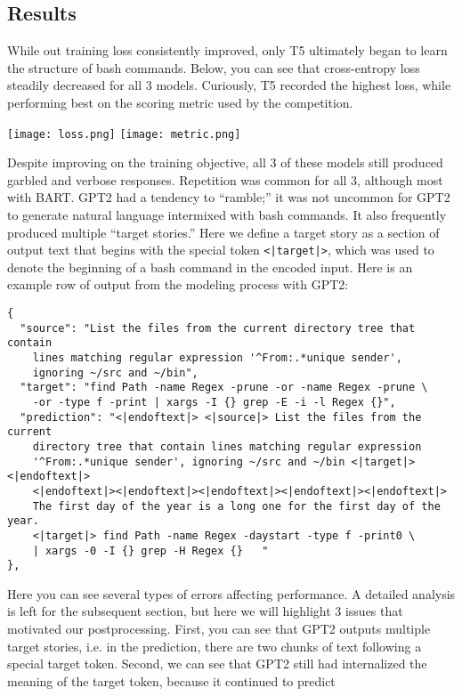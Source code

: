 \documentclass{article}
\begin{document}
\subsection{Results}
While out training loss consistently improved, only T5 ultimately began to
learn the structure of bash commands. Below, you can see that cross-entropy
loss steadily decreased for all 3 models. Curiously, T5 recorded the highest
loss, while performing best on the scoring metric used by the competition.
\begin{center}
	\texttt{[image: loss.png]}
	\texttt{[image: metric.png]}
\end{center}
Despite improving on the training objective, all 3 of these models still
produced garbled and verbose responses. Repetition was common for all 3,
although most with BART. GPT2 had a tendency to ``ramble;'' it was not uncommon
for GPT2 to generate natural language intermixed with bash commands. It also
frequently produced multiple ``target stories.'' Here we define a target story
as a section of output text that begins with the special token
\texttt{<|target|>}, which was used to denote the beginning of a bash command
in the encoded input. Here is an example row of output from the modeling process with GPT2:
\begin{verbatim}
{
  "source": "List the files from the current directory tree that contain
    lines matching regular expression '^From:.*unique sender',
    ignoring ~/src and ~/bin",
  "target": "find Path -name Regex -prune -or -name Regex -prune \
    -or -type f -print | xargs -I {} grep -E -i -l Regex {}",
  "prediction": "<|endoftext|> <|source|> List the files from the current
    directory tree that contain lines matching regular expression
    '^From:.*unique sender', ignoring ~/src and ~/bin <|target|><|endoftext|>
    <|endoftext|><|endoftext|><|endoftext|><|endoftext|><|endoftext|>
    The first day of the year is a long one for the first day of the year.
    <|target|> find Path -name Regex -daystart -type f -print0 \
    | xargs -0 -I {} grep -H Regex {}   "
},
\end{verbatim}
Here you can see several types of errors affecting performance. A detailed
analysis is left for the subsequent section, but here we will highlight 3
issues that motivated our postprocessing. First, you can see that GPT2 outputs
multiple target stories, i.e. in the prediction, there are two chunks of text
following a special target token. Second, we can see that GPT2 still had
internalized the meaning of the target token, because it continued to predict
\end{document}
